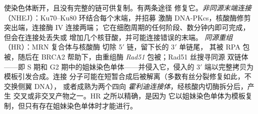 \begin{definition}[双链断裂修复]\label{def:b3:dna-repair:dsb}
\emph{}使染色体断开，且没有完整的链可供复制。有两条途径
修复它。\emph{非同源末端连接}
（NHEJ）：Ku70--Ku80 环结合每个末端，并招募
激酶 DNA-PKcs，核酸酶修剪突出端，连接酶 IV 连接两端；
它在细胞周期的任何阶段、数分钟内即可完成，但会在连接处丢失或
增加几个核苷酸，并可能连接错误的末端。
\emph{同源重组}（HR）：MRN 复合体与核酸酶
切除 5$'$ 链，留下长的 3$'$ 单链尾，
其被 RPA 包被，随后在 BRCA2 帮助下，由重组酶
\emph{Rad51} 包被；Rad51 丝搜寻同源
双链体——即 S 期和 G2 期中的姐妹染色单体——并侵入它，侵入的
3$'$ 端以完整拷贝为模板引发合成。连接
分子可能在短暂合成后被解离（多数有丝分裂修复如此，不交换侧翼 DNA），
或者成熟为两个四向
\emph{霍利迪连接体}，经核酸内切酶拆分后，产生
交叉或非交叉产物之一。HR 之所以精确，是因为
它以姐妹染色单体为模板复制，但只有存在姐妹染色单体时才能进行。
\end{definition}

